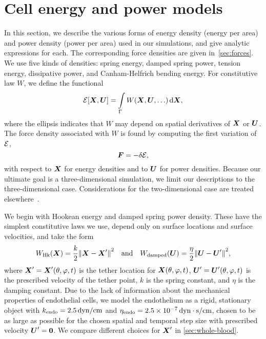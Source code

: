 \section{Cell energy and power models}\label{sec:energy}

In this section, we describe the various forms of energy density (energy per area) and power density (power per
area) used in our simulations, and give analytic expressions for each. The corresponding force densities are given
in~\ref{sec:forces}. We use five kinds of densities: spring energy, damped spring power, tension energy,
dissipative power, and Canham-Helfrich bending energy. For constitutive law $W$, we define the functional
\begin{equation}
    \energy[\X, \U] = \int\limits_\interface W(\X, \U, \ldots) \d\X,
\end{equation}
where the ellipsis indicates that $W$ may depend on spatial derivatives of $\boldsymbol{X}$ or $\boldsymbol{U}$. The force density
associated with $W$ is found by computing the first variation of $\mathcal{E}$,
\begin{equation}
    \boldsymbol{F} = -\delta\mathcal{E},
\end{equation}
with respect to $\boldsymbol{X}$ for energy densities and to $\boldsymbol{U}$ for power densities. Because our ultimate goal is a
three-dimensional simulation, we limit our descriptions to the three-dimensional case. Considerations for the
two-dimensional case are treated elsewhere~\cite{Peskin:2002go,Erickson:2010uzba}.

We begin with Hookean energy and damped spring power density. These have the simplest constitutive laws we use,
depend only on surface locations and surface velocities, and take the form
\begin{equation}
        W_\text{Hk}(\boldsymbol{X}) = \frac{k}2 {\|\boldsymbol{X} - \boldsymbol{X}'\|}^2\quad\text{and}\quad
        W_\text{damped}(\boldsymbol{U}) = \frac{\eta}2{\|\boldsymbol{U} - \boldsymbol{U}'\|}^2,
\end{equation}
where $\boldsymbol{X}'=\boldsymbol{X}'(\theta, \varphi, t)$ is the tether location for $\boldsymbol{X}(\theta, \varphi, t)$,
$\boldsymbol{U}'=\boldsymbol{U}'(\theta, \varphi, t)$ is the prescribed velocity of the tether point, $k$ is the spring constant, and
$\eta$ is the damping constant.  Due to the lack of information about the mechanical properties of endothelial
cells, we model the endothelium as a rigid, stationary object with $\ethm{k}=2.5\dynpercm$ and
$\ethm\eta=2.5\sci{-7}\dynsecpercm$, chosen to be as large as possible for the chosen spatial and temporal step
size with prescribed velocity $\boldsymbol{U}' = \boldsymbol{0}$. We compare different choices for $\boldsymbol{X}'$ in \cref{sec:whole-blood}.

